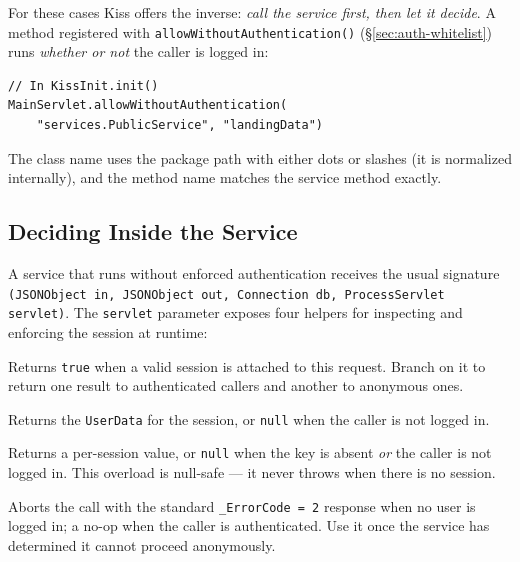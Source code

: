 For these cases Kiss offers the inverse: \emph{call the service first, then let it decide}.  A method registered with \texttt{allowWithoutAuthentication()} (\S\ref{sec:auth-whitelist}) runs \emph{whether or not} the caller is logged in:

\begin{lstlisting}[style=groovy]
// In KissInit.init()
MainServlet.allowWithoutAuthentication(
    "services.PublicService", "landingData")
\end{lstlisting}

\noindent
The class name uses the package path with either dots or slashes (it is normalized internally), and the method name matches the service method exactly.

\subsection{Deciding Inside the Service}

A service that runs without enforced authentication receives the usual signature \texttt{(JSONObject in, JSONObject out, Connection db, ProcessServlet servlet)}.  The \texttt{servlet} parameter exposes four helpers for inspecting and enforcing the session at runtime:

\begin{description}[style=nextline]
  \item[\texttt{servlet.isLoggedIn()}] Returns \texttt{true} when a valid session is attached to this request.  Branch on it to return one result to authenticated callers and another to anonymous ones.
  \item[\texttt{servlet.getUserData()}] Returns the \texttt{UserData} for the session, or \texttt{null} when the caller is not logged in.
  \item[\texttt{servlet.getUserData(key)}] Returns a per-session value, or \texttt{null} when the key is absent \emph{or} the caller is not logged in.  This overload is null-safe --- it never throws when there is no session.
  \item[\texttt{servlet.requireLogin()}] Aborts the call with the standard \texttt{\_ErrorCode = 2} response when no user is logged in; a no-op when the caller is authenticated.  Use it once the service has determined it cannot proceed anonymously.
\end{description}

